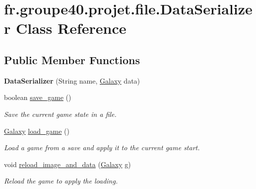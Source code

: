 \hypertarget{classfr_1_1groupe40_1_1projet_1_1file_1_1_data_serializer}{}\section{fr.\+groupe40.\+projet.\+file.\+Data\+Serializer Class Reference}
\label{classfr_1_1groupe40_1_1projet_1_1file_1_1_data_serializer}
\subsection*{Public Member Functions}
\begin{DoxyCompactItemize}
\item 
\mbox{\label{classfr_1_1groupe40_1_1projet_1_1file_1_1_data_serializer_a6424f3371fa177b49444b47882ddc776}} 
{\bfseries Data\+Serializer} (String name, \mbox{\hyperlink{classfr_1_1groupe40_1_1projet_1_1model_1_1board_1_1_galaxy}{Galaxy}} data)
\item 
boolean \mbox{\hyperlink{classfr_1_1groupe40_1_1projet_1_1file_1_1_data_serializer_a007629e3f94601342175120cd37b9f2a}{save\+\_\+game}} ()
\begin{DoxyCompactList}\small\item\em Save the current game state in a file. \end{DoxyCompactList}\item 
\mbox{\hyperlink{classfr_1_1groupe40_1_1projet_1_1model_1_1board_1_1_galaxy}{Galaxy}} \mbox{\hyperlink{classfr_1_1groupe40_1_1projet_1_1file_1_1_data_serializer_aee21aaad042ebf0a5e6eb43f2844cecc}{load\+\_\+game}} ()
\begin{DoxyCompactList}\small\item\em Load a game from a save and apply it to the current game start. \end{DoxyCompactList}\item 
void \mbox{\hyperlink{classfr_1_1groupe40_1_1projet_1_1file_1_1_data_serializer_a777ad420962d628b445d6012a5cfffb2}{reload\+\_\+image\+\_\+and\+\_\+data}} (\mbox{\hyperlink{classfr_1_1groupe40_1_1projet_1_1model_1_1board_1_1_galaxy}{Galaxy}} g)
\begin{DoxyCompactList}\small\item\em Reload the game to apply the loading. \end{DoxyCompactList}\end{DoxyCompactItemize}


